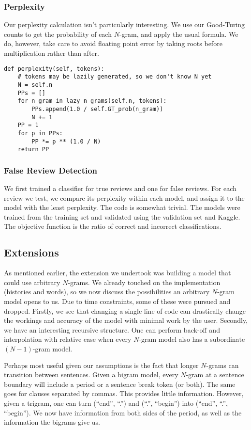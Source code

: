 \documentclass[12pt]{article}
\begin{document}
\subsubsection{Perplexity}
Our perplexity calculation isn't particularly interesting. We use our Good-Turing counts to get the probability of each $N$-gram, and apply the usual formula. We do, however, take care to avoid floating point error by taking roots before multiplication rather than after.
\begin{lstlisting}
def perplexity(self, tokens):
	# tokens may be lazily generated, so we don't know N yet
	N = self.n
	PPs = []
	for n_gram in lazy_n_grams(self.n, tokens):
		PPs.append(1.0 / self.GT_prob(n_gram))
		N += 1
	PP = 1
	for p in PPs:
		PP *= p ** (1.0 / N)
	return PP
\end{lstlisting}

\subsubsection{False Review Detection}
We first trained a classifier for true reviews and one for false reviews. For each review we test, we compare its perplexity within each model, and assign it to the model with the least perplexity. The code is somewhat trivial. The models were trained from the training set and validated using the validation set and Kaggle. The objective function is the ratio of correct and incorrect classifications.

\subsection{Extensions}
As mentioned earlier, the extension we undertook was building a model that could use arbitrary $N$-grams. We already touched on the implementation (histories and words), so we now discuss the possibilities an arbitrary $N$-gram model opens to us. Due to time constraints, some of these were pursued and dropped. Firstly, we see that changing a single line of code can drastically change the workings and accuracy of the model with minimal work by the user. Secondly, we have an interesting recursive structure. One can perform back-off and interpolation with relative ease when every $N$-gram model also has a subordinate $(N - 1)$-gram model.

Perhaps most useful given our assumptions is the fact that longer $N$-grams can transition between sentences. Given a bigram model, every $N$-gram at a sentence boundary will include a period or a sentence break token (or both). The same goes for clauses separated by commas. This provides little information. However, given a trigram, one can turn (``end'', ``.'') and (``.'', ``begin'') into (``end'', ``.'', ``begin''). We now have information from both sides of the period, as well as the information the bigrams give us.
\end{document}
